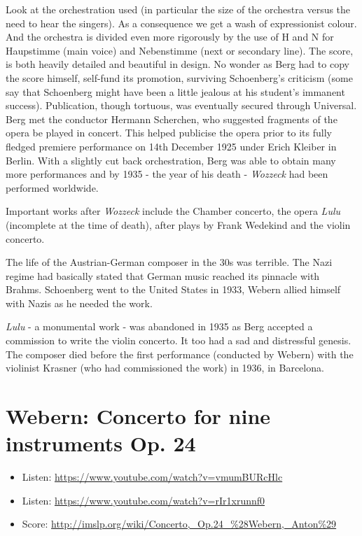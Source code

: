 Look at the orchestration used (in particular the size of the orchestra versus the need to hear the singers). As a consequence we get a wash of expressionist colour. And the orchestra is divided even more rigorously by the use of H and N for Haupstimme (main voice) and Nebenstimme (next or secondary line). The score, is both heavily detailed and beautiful in design. No wonder as Berg had to copy the score himself, self-fund its promotion, surviving Schoenberg's criticism (some say that Schoenberg might have been a little jealous at his student's immanent success). Publication, though tortuous, was eventually secured through Universal. Berg met the conductor Hermann Scherchen, who suggested fragments of the opera be played in concert. This helped publicise the opera prior to its fully fledged premiere performance on 14th December 1925 under Erich Kleiber in Berlin. With a slightly cut back orchestration, Berg was able to obtain many more performances and by 1935 - the year of his death - \textit{Wozzeck} had been performed worldwide.  

Important works after \textit{Wozzeck} include the Chamber concerto, the opera \textit{Lulu} (incomplete at the time of death), after plays by Frank Wedekind and the violin concerto.

The life of the Austrian-German composer in the 30s was terrible. The Nazi regime had basically stated that German music reached its pinnacle with Brahms. Schoenberg went to the United States in 1933, Webern allied himself with Nazis as he needed the work. 

\textit{Lulu} - a monumental work - was abandoned in 1935 as Berg accepted a commission to write the violin concerto. It too had a sad and distressful genesis. The composer died before the first performance (conducted by Webern) with the violinist Krasner (who had commissioned the work) in 1936, in Barcelona.  
 
\section{Webern: Concerto for nine instruments Op. 24}

\begin{itemize}
\item Listen: \url{https://www.youtube.com/watch?v=vmumBURcHlc}
\item Listen: \url{https://www.youtube.com/watch?v=rIr1xrunnf0}
\item Score: \url{http://imslp.org/wiki/Concerto,_Op.24_%28Webern,_Anton%29}
\end{itemize}


 
